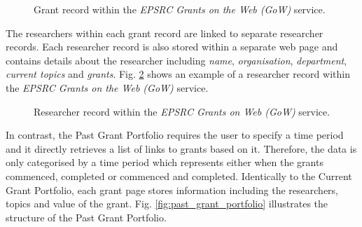 \begin{figure}[htpb]
    \centering
    \caption{Grant record within the \textit{EPSRC Grants on the Web (GoW)} service.}
    \label{fig:grant_record}
\end{figure}

The researchers within each grant record are linked to separate researcher records. Each researcher record is also stored within a separate web page and contains details about the researcher including \textit{name}, \textit{organisation}, \textit{department}, \textit{current topics} and \textit{grants}. Fig. \ref{fig:researcher_record} shows an example of a researcher record within the \textit{EPSRC Grants on the Web (GoW)} service.

\begin{figure}[htpb]
    \centering
    \caption{Researcher record within the \textit{EPSRC Grants on Web (GoW)} service.}
    \label{fig:researcher_record}
\end{figure}

\iffalse
The Current Grant Portfolio within GoW presents data categorised by different research entities such as research area, research topic, theme, industrial sector and so on. This project focuses primarily on research topics, so this entity is used for the following explanation.

The Research Topic page consists of a list of links to different research topics. Within each topic page, a list of links to grants is displayed which related to the topic selected. Each grant page stores information related to the grant such as the researchers working on the grant, the topic classifications of the grant and the value of the grant in British Pounds. Fig. \ref{fig:current_grant_portfolio} illustrates the hierarchical structure of the Current Grant Portfolio.

\begin{figure}[htpb]
    \centering
    \texttt{[image: portfolios-explained/current\_grant\_portfolio]}
    \caption{Hierarchical structure of the Current Grant Portfolio.}
    \label{fig:current_grant_portfolio}
\end{figure}
\fi

\iffalse
In contrast, the Past Grant Portfolio requires the user to specify a time period and it directly retrieves a list of links to grants based on it. Therefore, the data is only categorised by a time period which represents
either when the grants commenced, completed or commenced and completed. Identically to the Current Grant Portfolio, each grant page stores information including the researchers, topics and value of the grant. Fig. \ref{fig:past_grant_portfolio} illustrates the structure of the Past Grant Portfolio.

